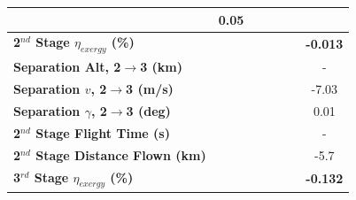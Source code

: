 \begin{table}[ht]
\begin{tabular}{l c c c c c c}
		&0.05
		\\
		\hline 
		\textbf{2$^{nd}$ Stage $\eta_{exergy}$ (\%)}
		& \textbf{\secondExergyEffmSPARTANNinetyNoReturn}
		& \textbf{\secondExergyEffmSPARTANNinetyFiveNoReturn}
		& \textbf{\secondExergyEffmSPARTANStandardNoReturn}
		& \textbf{\secondExergyEffmSPARTANOneHundredFiveNoReturn}
		& \textbf{\secondExergyEffmSPARTANOneHundredTenNoReturn}
		& \textbf{-0.013}
		\\
		\textbf{Separation Alt, 2$\rightarrow$3 (km)}
		& \secondthirdSeparationAltmSPARTANNinetyNoReturn
		& \secondthirdSeparationAltmSPARTANNinetyFiveNoReturn
		& \secondthirdSeparationAltmSPARTANStandardNoReturn
		& \secondthirdSeparationAltmSPARTANOneHundredFiveNoReturn
		& \secondthirdSeparationAltmSPARTANOneHundredTenNoReturn
		& -
		\\
		\textbf{Separation $v$, 2$\rightarrow$3 (m/s)}
		& \secondthirdSeparationvmSPARTANNinetyNoReturn
		& \secondthirdSeparationvmSPARTANNinetyFiveNoReturn
		& \secondthirdSeparationvmSPARTANStandardNoReturn
		& \secondthirdSeparationvmSPARTANOneHundredFiveNoReturn
		& \secondthirdSeparationvmSPARTANOneHundredTenNoReturn
		&-7.03
		\\
		\textbf{Separation $\gamma$, 2$\rightarrow$3 (deg)}
		& \secondthirdSeparationgammamSPARTANNinetyNoReturn
		& \secondthirdSeparationgammamSPARTANNinetyFiveNoReturn
		& \secondthirdSeparationgammamSPARTANStandardNoReturn
		& \secondthirdSeparationgammamSPARTANOneHundredFiveNoReturn
		& \secondthirdSeparationgammamSPARTANOneHundredTenNoReturn
		&0.01
		\\
		\textbf{2$^{nd}$ Stage Flight Time (s)}
		& \secondFlightTimemSPARTANNinetyNoReturn
		& \secondFlightTimemSPARTANNinetyFiveNoReturn
		& \secondFlightTimemSPARTANStandardNoReturn
		& \secondFlightTimemSPARTANOneHundredFiveNoReturn
		& \secondFlightTimemSPARTANOneHundredTenNoReturn
		& -
		\\
		\textbf{2$^{nd}$ Stage Distance Flown (km)}
		& \SecondDistmSPARTANNinetyNoReturn
		& \SecondDistmSPARTANNinetyFiveNoReturn
		& \SecondDistmSPARTANStandardNoReturn
		& \SecondDistmSPARTANOneHundredFiveNoReturn
		& \SecondDistmSPARTANOneHundredTenNoReturn
		&-5.7
		\\
		\hline 
		\textbf{3$^{rd}$ Stage $\eta_{exergy}$ (\%)}
		& \textbf{\thirddExergyEffmSPARTANNinetyNoReturn}
		& \textbf{\thirddExergyEffmSPARTANNinetyFiveNoReturn}
		& \textbf{\thirddExergyEffmSPARTANStandardNoReturn}
		& \textbf{\thirddExergyEffmSPARTANOneHundredFiveNoReturn}
		& \textbf{\thirddExergyEffmSPARTANOneHundredTenNoReturn}
		& \textbf{-0.132}

\end{tabular}
\end{table}
